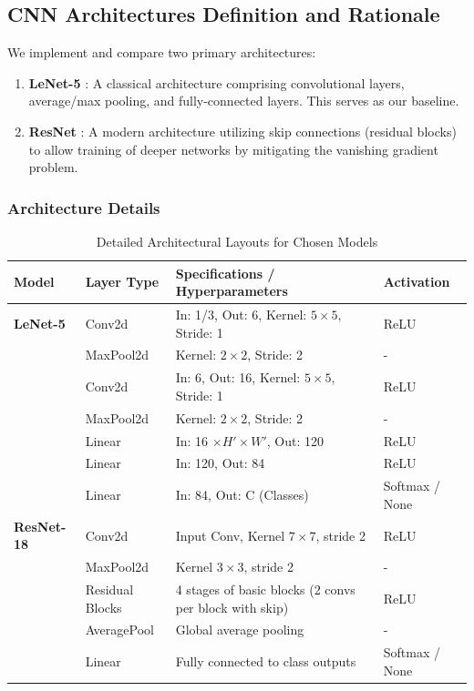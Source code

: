 \documentclass{name}
\begin{document}
\subsection{CNN Architectures Definition and Rationale}
We implement and compare two primary architectures:
\begin{enumerate}
    \item \textbf{LeNet-5} \cite{lecun1998gradient}: A classical architecture comprising convolutional layers, average/max pooling, and fully-connected layers. This serves as our baseline.
    \item \textbf{ResNet} \cite{he2016deep}: A modern architecture utilizing skip connections (residual blocks) to allow training of deeper networks by mitigating the vanishing gradient problem.
\end{enumerate}

\subsubsection{Architecture Details}
\begin{table}[H]
\centering
\caption{Detailed Architectural Layouts for Chosen Models}
\label{tab:architectures}
\begin{tabular}{llll}
\toprule
Model & Layer Type & Specifications / Hyperparameters & Activation \\
\midrule
\textbf{LeNet-5} & Conv2d & In: 1/3, Out: 6, Kernel: $5 \times 5$, Stride: 1 & ReLU \\
 & MaxPool2d & Kernel: $2 \times 2$, Stride: 2 & - \\
 & Conv2d & In: 6, Out: 16, Kernel: $5 \times 5$, Stride: 1 & ReLU \\
 & MaxPool2d & Kernel: $2 \times 2$, Stride: 2 & - \\
 & Linear & In: 16 $\times H' \times W'$, Out: 120 & ReLU \\
 & Linear & In: 120, Out: 84 & ReLU \\
 & Linear & In: 84, Out: C (Classes) & Softmax / None \\
\midrule
\textbf{ResNet-18} & Conv2d & Input Conv, Kernel $7\times7$, stride 2 & ReLU \\
 & MaxPool2d & Kernel $3\times3$, stride 2 & - \\
 & Residual Blocks & 4 stages of basic blocks (2 convs per block with skip) & ReLU \\
 & AveragePool & Global average pooling & - \\
 & Linear & Fully connected to class outputs & Softmax / None \\
\bottomrule
\end{tabular}
\end{table}
\end{document}
